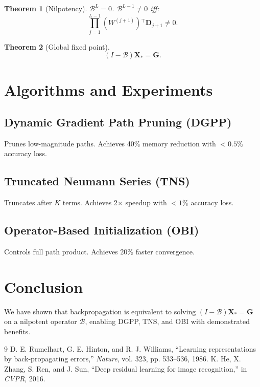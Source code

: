 \documentclass[10pt, conference, compsocconf]{IEEEtran}
\theoremstyle{plain}
\newtheorem{theorem}{Theorem}[section]
\theoremstyle{definition}
\theoremstyle{remark}
\newcommand{\transp}{{}^{\top}}
\newcommand{\cB}{\mathcal{B}}
\newcommand{\Xs}{\mathbf{X}_{*}}
\newcommand{\bG}{\mathbf{G}}
\newcommand{\Dell}{\mathbf{D}}
\begin{document}
\begin{theorem}[Nilpotency]
$\cB^L = 0$. $\cB^{L-1} \neq 0$ iff:
\[
\prod_{j=1}^{L-1} (W^{(j+1)})\transp \Dell_{j+1} \neq 0.
\]
\end{theorem}

\begin{theorem}[Global fixed point]
\[
(I - \cB)\Xs = \bG.
\]
\end{theorem}

\section{Algorithms and Experiments}

\subsection{Dynamic Gradient Path Pruning (DGPP)}
Prunes low-magnitude paths. Achieves 40\% memory reduction with $<0.5\%$ accuracy loss.

\subsection{Truncated Neumann Series (TNS)}
Truncates after $K$ terms. Achieves 2$\times$ speedup with $<1\%$ accuracy loss.

\subsection{Operator-Based Initialization (OBI)}
Controls full path product. Achieves 20\% faster convergence.

\section{Conclusion}

We have shown that backpropagation is equivalent to solving $(I-\cB)\Xs = \bG$ on a nilpotent operator $\cB$, enabling DGPP, TNS, and OBI with demonstrated benefits.


\begin{thebibliography}{9}
D. E. Rumelhart, G. E. Hinton, and R. J. Williams, ``Learning representations by back-propagating errors,'' \emph{Nature}, vol. 323, pp. 533--536, 1986.
K. He, X. Zhang, S. Ren, and J. Sun, ``Deep residual learning for image recognition,'' in \emph{CVPR}, 2016.
\end{thebibliography}
\end{document}
